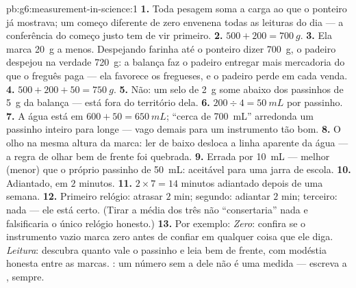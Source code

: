 \begin{solution}{pb:g6:measurement-in-science:1}
\textbf{1.} Toda pesagem soma a carga ao que o ponteiro já mostrava;
um começo diferente de zero envenena todas as leituras do dia --- a
conferência do começo justo tem de vir primeiro.
\textbf{2.} $500 + 200 = \qty{700}{g}$.
\textbf{3.} Ela marca \qty{20}{g} a menos. Despejando farinha até o
ponteiro dizer \qty{700}{g}, o padeiro despejou na verdade
\qty{720}{g}: a balança faz o padeiro entregar mais mercadoria do que
o freguês paga --- ela favorece os fregueses, e o padeiro perde em
cada venda.
\textbf{4.} $500 + 200 + 50 = \qty{750}{g}$.
\textbf{5.} Não: um selo de \qty{2}{g} some abaixo dos passinhos de
\qty{5}{g} da balança --- está fora do território dela.
\textbf{6.} $200 \div 4 = \qty{50}{mL}$ por passinho.
\textbf{7.} A água está em $600 + 50 = \qty{650}{mL}$; ``cerca de
\qty{700}{mL}'' arredonda um passinho inteiro para longe --- vago
demais para um instrumento tão bom.
\textbf{8.} O olho na mesma altura da marca: ler de baixo desloca a
linha aparente da água --- a regra de olhar bem de frente foi
quebrada.
\textbf{9.} Errada por \qty{10}{mL} --- melhor (menor) que o próprio
passinho de \qty{50}{mL}: aceitável para uma jarra de escola.
\textbf{10.} Adiantado, em $2$ minutos.
\textbf{11.} $2 \times 7 = 14$ minutos adiantado depois de uma
semana.
\textbf{12.} Primeiro relógio: atrasar $2$ min; segundo: adiantar $2$
min; terceiro: nada --- ele está certo. (Tirar a média dos três não
``consertaria'' nada e falsificaria o único relógio honesto.)
\textbf{13.} Por exemplo: \emph{Zero}: confira se o instrumento vazio
marca zero antes de confiar em qualquer coisa que ele diga.
\emph{Leitura}: descubra quanto vale o passinho e leia bem de frente,
com modéstia honesta entre as marcas. \emph{}: um número sem
a  dele não é uma medida --- escreva a , sempre.
\end{solution}
